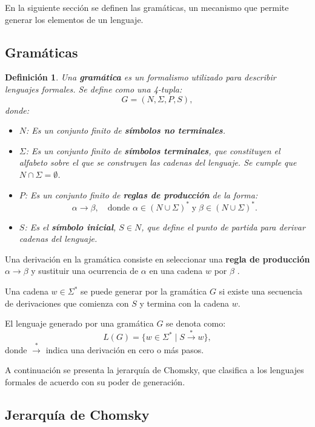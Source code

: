 \documentclass[12pt]{article}
\newtheorem{definition}{Definición}
\begin{document}
En la siguiente sección se definen las gramáticas, un mecanismo que permite generar los elementos de un lenguaje.

\subsection{Gramáticas}
\label{sec:grammars}

\begin{definition}
  Una \textbf{gramática} es un formalismo utilizado para describir lenguajes formales. Se define como una 4-tupla:
  \[
    G = (N, \Sigma, P, S),
  \]
  donde:
  \begin{itemize}
    \item \(N\): Es un conjunto finito de \textbf{símbolos no terminales}.
    \item \(\Sigma\): Es un conjunto finito de \textbf{símbolos terminales}, que constituyen el alfabeto sobre el que se construyen las cadenas del lenguaje. Se cumple que \(N \cap \Sigma = \emptyset\).
    \item \(P\): Es un conjunto finito de \textbf{reglas de producción} de la forma:
          \[
            \alpha \to \beta, \quad \text{donde } \alpha \in (N \cup \Sigma)^* \;\text{y}\; \beta \in (N \cup \Sigma)^*.
          \]
          
    \item \(S\): Es el \textbf{símbolo inicial}, \(S \in N\), que define el punto de partida para derivar cadenas del lenguaje.
  \end{itemize}
\end{definition}


Una derivación en la gramática consiste en seleccionar una \textbf{regla de producción} $\alpha \to \beta$ y sustituir una ocurrencia de 
$\alpha$ en una cadena $w$ por $\beta$ \cite{authomataTheory}.

Una cadena $w\in\Sigma^*$  se puede generar por la gramática $G$ si existe una secuencia de derivaciones que comienza con $S$
y termina con la cadena $w$.

El lenguaje generado por una gramática \(G\) se denota como:
\[
  L(G) = \{ w \in \Sigma^* \mid S \overset{*}{\to} w \},
\]
donde \(\overset{*}{\to}\) indica una derivación en cero o más pasos.

A continuación se presenta la jerarquía de Chomsky, que clasifica a los lenguajes formales de acuerdo con su poder de generación.

\subsection{Jerarquía de Chomsky}
\end{document}
